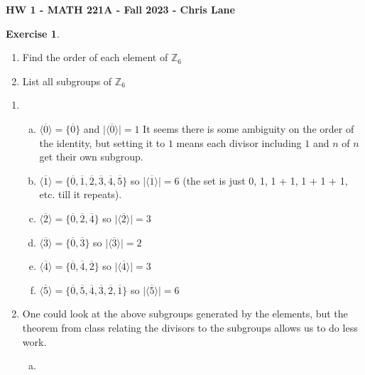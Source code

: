 \documentclass[11pt,oneside]{article}
\numberwithin{equation}{section}
\theoremstyle{definition}
\newtheorem{exercise}{Exercise}
\def\ZZ{\mathbb{Z}}
\begin{document}
\textbf{HW 1 - MATH 221A - Fall 2023 - Chris Lane}

\begin{exercise}
\begin{enumerate}[(1)]
\item 
Find the order of each element of $ \ZZ _ 6 $
\item 
  List all subgroups of $ \ZZ _ 6 $
\end{enumerate}
\end{exercise}

\begin{solution}
\begin{enumerate}[(1)]
\item 
\begin{enumerate}[(a)]
\item 
    $ \langle \overline 0 \rangle  = \{ \overline 0 \} $ and $ \lvert \langle \overline 0 \rangle \rvert = 1 $ It seems there is some ambiguity on the order of the identity, but setting it to $ 1 $ means each divisor including $1$ and $n$ of $n$ get their own subgroup.  
  \item
    $ \langle \overline 1 \rangle  = \{ \overline 0, \overline 1, \overline 2, \overline 3, \overline 4, \overline 5 \} $ so $ \lvert \langle \overline 1 \rangle \rvert = 6 $ (the set is just 0, 1, 1 + 1, 1 + 1 + 1, etc. till it repeats).
  \item
    $ \langle \overline 2 \rangle  = \{ \overline 0, \overline  2, \overline  4 \} $ so $ \lvert \langle \overline 2 \rangle \rvert = 3 $
  \item
    $ \langle \overline 3 \rangle  = \{ \overline 0, \overline  3 \} $ so $ \lvert \langle \overline 3 \rangle \rvert = 2 $
  \item
    $ \langle \overline 4 \rangle  = \{ \overline 0, \overline  4, \overline  2 \} $ so $ \lvert \langle \overline 4 \rangle \rvert = 3 $
  \item
    $ \langle \overline 5 \rangle  = \{ \overline 0 , \overline 5 , \overline 4 , \overline 3 , \overline 2 , \overline 1 \} $ so $ \lvert \langle \overline 5 \rangle \rvert = 6 $
\end{enumerate}
\item 
  One could look at the above subgroups generated by the elements, but the theorem from class relating the divisors to the subgroups allows us to do less work.  
\begin{enumerate}[(a)]
\item 

\end{enumerate}
\end{enumerate}
\end{solution}
\end{document}
